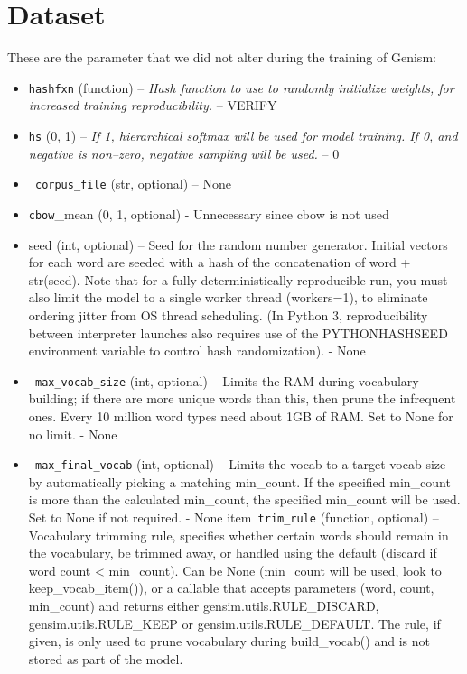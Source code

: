 \chapter{Dataset}
These are the parameter that we did not alter during the training of Genism:
\begin{itemize}
   \item \texttt{hashfxn} (function) -- \textit{Hash function to use to randomly initialize weights, for increased training reproducibility. }-- VERIFY 
  \item  \texttt{hs} ({0, 1}) --\textit{ If 1, hierarchical softmax will be used for model training. If 0, and negative is non--zero, negative sampling will be used. }-- 0
 \item  \texttt{ corpus\_file} (str, optional) – None
   \item \texttt{cbow}\_mean ({0, 1}, optional) - Unnecessary since cbow is not used
    \item seed (int, optional) – Seed for the random number generator. Initial vectors for each word are seeded with a hash of the concatenation of word + str(seed). Note that for a fully deterministically-reproducible run, you must also limit the model to a single worker thread (workers=1), to eliminate ordering jitter from OS thread scheduling. (In Python 3, reproducibility between interpreter launches also requires use of the PYTHONHASHSEED environment variable to control hash randomization). - None 
\item   \texttt{ max\_vocab\_size} (int, optional) – Limits the RAM during vocabulary building; if there are more unique words than this, then prune the infrequent ones. Every 10 million word types need about 1GB of RAM. Set to None for no limit. - None 
\item \texttt{   max\_final\_vocab} (int, optional) – Limits the vocab to a target vocab size by automatically picking a matching min\_count. If the specified min\_count is more than the calculated min\_count, the specified min\_count will be used. Set to None if not required. - None
item\texttt{   trim\_rule} (function, optional) –Vocabulary trimming rule, specifies whether certain words should remain in the vocabulary, be trimmed away, or handled using the default (discard if word count < min\_count). Can be None (min\_count will be used, look to keep\_vocab\_item()), or a callable that accepts parameters (word, count, min\_count) and returns either gensim.utils.RULE\_DISCARD, gensim.utils.RULE\_KEEP or gensim.utils.RULE\_DEFAULT. The rule, if given, is only used to prune vocabulary during build\_vocab() and is not stored as part of the model.


\end{itemize}
